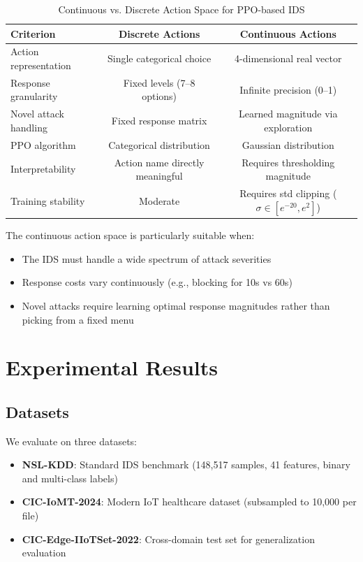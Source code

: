 \documentclass[conference]{IEEEtran}
\begin{document}
\begin{table}[htbp]
\centering
\caption{Continuous vs. Discrete Action Space for PPO-based IDS}
\label{tab:continuous_vs_discrete}
\begin{tabular}{lcc}
\toprule
\textbf{Criterion} & \textbf{Discrete Actions} & \textbf{Continuous Actions} \\
\midrule
Action representation & Single categorical choice & 4-dimensional real vector \\
Response granularity & Fixed levels (7--8 options) & Infinite precision (0--1) \\
Novel attack handling & Fixed response matrix & Learned magnitude via exploration \\
PPO algorithm & Categorical distribution & Gaussian distribution \\
Interpretability & Action name directly meaningful & Requires thresholding magnitude \\
Training stability & Moderate & Requires std clipping ($\sigma \in [e^{-20}, e^{2}]$) \\
\bottomrule
\end{tabular}
\end{table}

The continuous action space is particularly suitable when:
\begin{itemize}
    \item The IDS must handle a wide spectrum of attack severities
    \item Response costs vary continuously (e.g., blocking for 10s vs 60s)
    \item Novel attacks require learning optimal response magnitudes rather than picking from a fixed menu
\end{itemize}

\section{Experimental Results}

\subsection{Datasets}

We evaluate on three datasets:
\begin{itemize}
    \item \textbf{NSL-KDD}: Standard IDS benchmark (148,517 samples, 41 features, binary and multi-class labels)
    \item \textbf{CIC-IoMT-2024}: Modern IoT healthcare dataset (subsampled to 10,000 per file)
    \item \textbf{CIC-Edge-IIoTSet-2022}: Cross-domain test set for generalization evaluation
\end{itemize}
\end{document}
